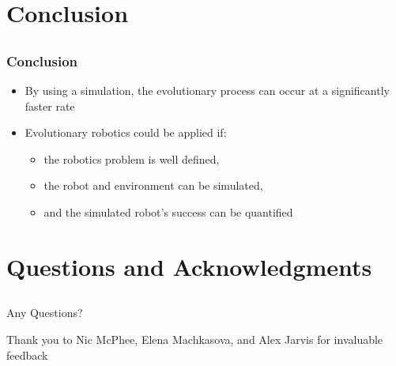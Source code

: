 \documentclass{beamer}
\begin{document}
\section{Conclusion}
\subsection{}
\begin{frame}
  \frametitle{Conclusion}
  \begin{itemize}
\item By using a simulation, the evolutionary process can occur at a significantly faster rate
\item Evolutionary robotics could be applied if:
 \begin{itemize}
\item the robotics problem is well defined, %
\item the robot and environment can be simulated,
\item and the simulated robot's success can be quantified
\end{itemize}
\end{itemize}
\end{frame}

\section{Questions and Acknowledgments}
\subsection{}
\begin{frame}
  \frametitle{}
  Any Questions?

Thank you to Nic McPhee, Elena Machkasova, and Alex Jarvis for invaluable feedback
\end{frame}
\end{document}

